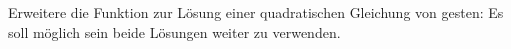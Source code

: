 \begin{aufg}
Erweitere die Funktion zur Lösung einer quadratischen Gleichung von gesten: Es soll möglich sein beide Lösungen weiter zu verwenden.
\end{aufg}